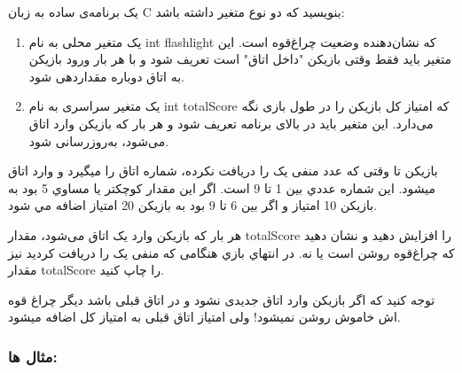 \documentclass{article}
\begin{document}
یک برنامه‌ی ساده به زبان C بنویسید که دو نوع متغیر داشته باشد:

\begin{enumerate}
\item یک متغیر محلی به نام int flashlight که نشان‌دهنده وضعیت چراغ‌قوه است. این متغیر باید فقط وقتی بازیکن "داخل اتاق" است تعریف شود و با هر بار ورود بازیکن به اتاق دوباره مقداردهی شود.
\item یک متغیر سراسری به نام int totalScore که امتیاز کل بازیکن را در طول بازی نگه می‌دارد. این متغیر باید در بالای برنامه تعریف شود و هر بار که بازیکن وارد اتاق می‌شود، به‌روزرسانی شود.
\end{enumerate}
بازیکن تا وقتی که عدد منفی یک را دریافت نکرده، شماره اتاق را میگیرد و وارد اتاق میشود. اين شماره عددي بين 1 تا 9 است. اگر اين مقدار كوچكتر يا مساوي 5 بود به بازيكن 10 امتياز و اگر بين 6 تا 9 بود به بازيكن 20 امتياز اضافه مي شود.

 هر بار که بازیکن وارد یک اتاق می‌شود، مقدار totalScore را افزایش دهید و نشان دهید که چراغ‌قوه روشن است یا نه. در انتهاي بازي هنگامی که منفی یک را دریافت کردید نيز مقدار totalScore را چاپ كنيد.

توجه کنید که اگر بازیکن وارد اتاق جدیدی نشود و در اتاق قبلی باشد دیگر چراغ قوه اش خاموش روشن نمیشود! ولی امتیاز اتاق قبلی به امتیاز کل اضافه میشود.

\subsubsection{مثال ها:}
\end{document}
